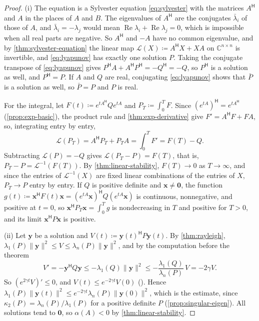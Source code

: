 \begin{proof}
(i) The equation is a Sylvester equation \eqref{eq:sylvester} with the matrices $A^{\mathsf H}$ and $A$ in the places of $A$ and $B$. The eigenvalues of $A^{\mathsf H}$ are the conjugates $\bar\lambda_i$ of those of $A$, and $\bar\lambda_i=-\lambda_j$ would mean $\operatorname{Re}\lambda_i+\operatorname{Re}\lambda_j=0$, which is impossible when all real parts are negative. So $A^{\mathsf H}$ and $-A$ have no common eigenvalue, and by \cref{thm:sylvester-equation} the linear map $\mathcal L(X)\coloneqq A^{\mathsf H}X+XA$ on $\mathbb C^{n\times n}$ is invertible, and \eqref{eq:lyapunov} has exactly one solution $P$. Taking the conjugate transpose of \eqref{eq:lyapunov} gives $P^{\mathsf H}A+A^{\mathsf H}P^{\mathsf H}=-Q^{\mathsf H}=-Q$, so $P^{\mathsf H}$ is a solution as well, and $P^{\mathsf H}=P$. If $A$ and $Q$ are real, conjugating \eqref{eq:lyapunov} shows that $\bar P$ is a solution as well, so $\bar P=P$ and $P$ is real.

For the integral, let $F(t)\coloneqq e^{tA^{\mathsf H}}Qe^{tA}$ and $P_T\coloneqq\int_0^TF$. Since $(e^{tA})^{\mathsf H}=e^{tA^{\mathsf H}}$ (\cref{prop:exp-basic}), the product rule and \cref{thm:exp-derivative} give $F'=A^{\mathsf H}F+FA$, so, integrating entry by entry,
\[
\mathcal L(P_T)=A^{\mathsf H}P_T+P_TA=\int_0^TF'=F(T)-Q .
\]
Subtracting $\mathcal L(P)=-Q$ gives $\mathcal L(P_T-P)=F(T)$, that is, $P_T-P=\mathcal L^{-1}(F(T))$. By \cref{thm:linear-stability}, $F(T)\to0$ as $T\to\infty$, and since the entries of $\mathcal L^{-1}(X)$ are fixed linear combinations of the entries of $X$, $P_T\to P$ entry by entry. If $Q$ is positive definite and $\mathbf x\ne\mathbf 0$, the function $g(t)\coloneqq\mathbf x^{\mathsf H}F(t)\mathbf x=(e^{tA}\mathbf x)^{\mathsf H}Q(e^{tA}\mathbf x)$ is continuous, nonnegative, and positive at $t=0$, so $\mathbf x^{\mathsf H}P_T\mathbf x=\int_0^Tg$ is nondecreasing in $T$ and positive for $T>0$, and its limit $\mathbf x^{\mathsf H}P\mathbf x$ is positive.

(ii) Let $\mathbf y$ be a solution and $V(t)\coloneqq\mathbf y(t)^{\mathsf H}P\mathbf y(t)$. By \cref{thm:rayleigh}, $\lambda_1(P)\|\mathbf y\|^2\le V\le\lambda_n(P)\|\mathbf y\|^2$, and by the computation before the theorem
\[
V'=-\mathbf y^{\mathsf H}Q\mathbf y\le-\lambda_1(Q)\|\mathbf y\|^2\le-\frac{\lambda_1(Q)}{\lambda_n(P)}\,V=-2\gamma V .
\]
So $(e^{2\gamma t}V)'\le0$, and $V(t)\le e^{-2\gamma t}V(0)$ (). Hence $\lambda_1(P)\|\mathbf y(t)\|^2\le e^{-2\gamma t}\lambda_n(P)\|\mathbf y(0)\|^2$, which is the estimate, since $\kappa_2(P)=\lambda_n(P)/\lambda_1(P)$ for a positive definite $P$ (\cref{prop:singular-eigen}). All solutions tend to $\mathbf 0$, so $\alpha(A)<0$ by \cref{thm:linear-stability}.
\end{proof}

